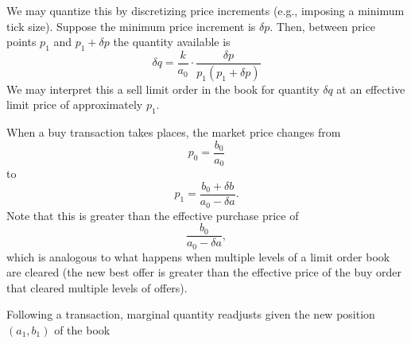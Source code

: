 \documentclass[11pt, reqno]{amsart}
\theoremstyle{definition}
\theoremstyle{remark}
\begin{document}
We may quantize this by discretizing price increments (e.g., imposing a
minimum tick size). Suppose the minimum price increment is $\delta p$.
Then, between price points $p_1$ and $p_1 + \delta p$ the quantity
available is
\[
	\delta q = \frac{k}{a_0} \cdot \frac{\delta p}{p_1 (p_1 + \delta p)}
\]
We may interpret this a sell limit order in the book for quantity
$\delta q$ at an effective limit price of approximately $p_1$.

When a buy transaction takes places, the market price changes from
\[
	p_0 = \frac{b_0}{a_0}
\]
to
\[
	p_1 = \frac{b_0 + \delta b}{a_0 - \delta a}.
\]
Note that this is greater than the effective purchase price of
\[
	\frac{b_0}{a_0 - \delta a},
\]
which is analogous to what happens when multiple levels of a limit order book
are cleared (the new best offer is greater than the effective price of the buy
order that cleared multiple levels of offers).

Following a transaction, marginal quantity readjusts given the new position
$(a_1, b_1)$ of the book




\end{document}

